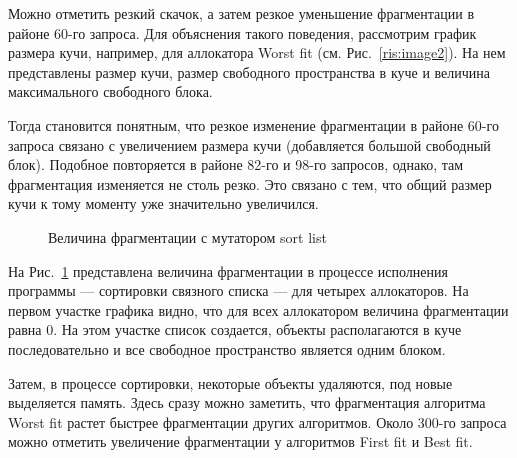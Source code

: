    Можно отметить резкий скачок, а затем резкое уменьшение фрагментации в районе 60-го запроса. Для объяснения такого поведения, 
рассмотрим график размера кучи,    например, для аллокатора Worst fit (см. Рис.~\ref{ris:image2}). На нем представлены размер кучи, 
размер свободного пространства в куче и величина максимального свободного блока.

   Тогда становится понятным, что резкое изменение фрагментации в районе 60-го запроса связано с увеличением размера кучи (добавляется 
большой свободный блок). Подобное повторяется в районе 82-го и 98-го запросов, однако, там фрагментация изменяется не столь резко. 
Это связано с тем, что общий размер кучи к тому моменту уже значительно увеличился.
      
   \begin{figure}[p]
   \caption{Величина фрагментации с мутатором sort list}
   \label{ris:image3}
   \end{figure}
   
   На Рис.~\ref{ris:image3} представлена величина фрагментации в процессе исполнения программы --- сортировки связного списка --- 
для четырех аллокаторов. На первом участке графика видно, что для всех аллокатором величина фрагментации равна 0. На этом участке 
список создается, объекты располагаются в куче последовательно и все свободное пространство является одним блоком. 
   
   Затем, в процессе сортировки, некоторые объекты удаляются, под новые выделяется память. Здесь сразу можно заметить, 
что фрагментация алгоритма Worst fit растет быстрее фрагментации других алгоритмов. Около 300-го запроса можно отметить 
увеличение фрагментации у алгоритмов First fit и Best fit. 
   
